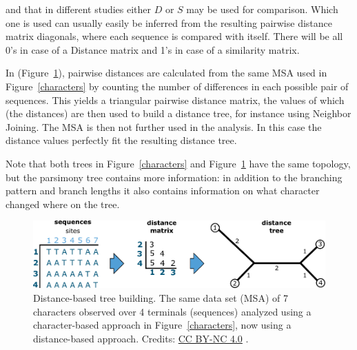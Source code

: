 and that in different studies either $D$ or $S$ may be used for comparison.
Which one is used can usually easily be inferred from the resulting pairwise distance matrix diagonals, where each sequence is compared with itself.
There will be all 0's in case of a Distance matrix and 1's in case of a similarity matrix.

In (Figure~\ref{character_distance_alt}), pairwise distances are calculated from the same MSA used in Figure~\ref{characters} by counting the number of differences in each possible pair of sequences.
This yields a triangular pairwise distance matrix, the values of which (the distances) are then used to build a distance tree, for instance using Neighbor Joining.
The MSA is then not further used in the analysis.
In this case the distance values perfectly fit the resulting distance tree.

Note that both trees in Figure~\ref{characters} and Figure~\ref{character_distance_alt} have the same topology, but the parsimony tree contains more information: in addition to the branching pattern and branch lengths it also contains information on what character changed where on the tree.

% 

\begin{figure}[!htbp]
\centering
\includegraphics[width=1\linewidth]{files/character-distance_a-dd4aefac86e95635c6a6ff3bd36239cb.pdf}
\caption[]{Distance-based tree building.
The same data set (MSA) of 7 characters observed over 4 terminals (sequences) analyzed using a character-based approach in Figure~\ref{characters}, now using a distance-based approach.
Credits: \href{https://creativecommons.org/licenses/by-nc/4.0/}{CC BY-NC 4.0} \cite{own_3_2024}.}
\label{character_distance_alt}
\end{figure}

